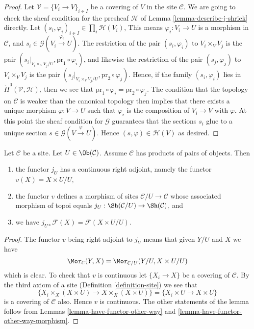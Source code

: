 \begin{proof}
Let $\mathcal{V} = \{V_i \to V\}_{i \in I}$ be a covering of $V$
in the site $\mathcal{C}$.
We are going to check the sheaf condition for the presheaf $\mathcal{H}$
of Lemma \ref{lemma-describe-j-shriek} directly.
Let $(s_i, \varphi_i)_{i \in I} \in \prod_i \mathcal{H}(V_i)$,
This means $\varphi_i : V_i \to U$ is a morphism in $\mathcal{C}$, and
$s_i \in \mathcal{G}(V_i \xrightarrow{\varphi_i} U)$.
The restriction of the pair $(s_i, \varphi_i)$ to
$V_i \times_V V_j$ is the pair
$(s_i|_{V_i \times_V V_j/U}, \text{pr}_1 \circ \varphi_i)$, and
likewise the restriction of the pair $(s_j, \varphi_j)$ to
$V_i \times_V V_j$ is the pair
$(s_j|_{V_i \times_V V_j/U}, \text{pr}_2 \circ \varphi_j)$.
Hence, if the family $(s_i, \varphi_i)$ lies in
$\check{H}^0(\mathcal{V}, \mathcal{H})$, then we see that
$\text{pr}_1 \circ \varphi_i = \text{pr}_2 \circ \varphi_j$.
The condition that the topology on $\mathcal{C}$ is weaker than the canonical
topology then implies that there exists a unique morphism
$\varphi : V \to U$ such that $\varphi_i$ is the composition
of $V_i \to V$ with $\varphi$. At this point the sheaf condition for
$\mathcal{G}$ guarantees that the sections $s_i$ glue to a unique
section $s \in \mathcal{G}(V \xrightarrow{\varphi} U)$.
Hence $(s, \varphi) \in \mathcal{H}(V)$ as desired.
\end{proof}

\begin{lemma}
\label{lemma-localize-given-products}
Let $\mathcal{C}$ be a site.
Let $U \in \Ob(\mathcal{C})$.
Assume $\mathcal{C}$ has products of pairs of objects.
Then
\begin{enumerate}
\item the functor $j_U$ has a continuous right adjoint,
namely the functor $v(X) = X \times U / U$,
\item the functor $v$ defines a morphism of sites
$\mathcal{C}/U \to \mathcal{C}$ whose associated morphism of topoi equals
$j_U : \Sh(\mathcal{C}/U) \to \Sh(\mathcal{C})$, and
\item we have $j_{U*}\mathcal{F}(X) = \mathcal{F}(X \times U/U)$.
\end{enumerate}
\end{lemma}

\begin{proof}
The functor $v$ being right adjoint to $j_U$ means that given $Y/U$ and $X$
we have
$$
\Mor_\mathcal{C}(Y, X)
=
\Mor_{\mathcal{C}/U}(Y/U, X \times U/U)
$$
which is clear. To check that $v$ is continuous let $\{X_i \to X\}$ be
a covering of $\mathcal{C}$. By the third axiom of a site
(Definition \ref{definition-site})
we see that
$$
\{X_i \times_X (X \times U) \to X \times_X (X \times U)\}
=
\{X_i \times U \to X \times U\}
$$
is a covering of $\mathcal{C}$ also. Hence $v$ is continuous. The other
statements of the lemma follow from Lemmas \ref{lemma-have-functor-other-way}
and \ref{lemma-have-functor-other-way-morphism}.
\end{proof}

